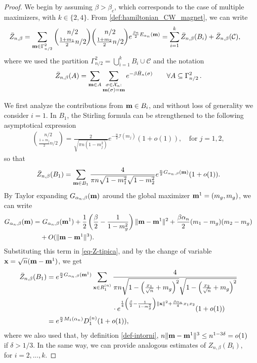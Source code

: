 \documentclass[10pt,a4paper]{amsart}
\def \bm {{\bf m}}
\def \s {{\sigma}}
\begin{document}
\begin{proof}
We begin by assuming $\beta>\beta_c$, which corresponds to the case of multiple maximizers, with $k\in\{2,4\}$. 
From  \eqref{def:hamiltonian_CW_magnet}, we can write
\begin{align*}
    \bar{Z}_{n,\beta} &=\sum_{\bm \in \Gamma_{n/2}^2} \binom{n/2}{\frac{1+m_1}{2}n/2} \binom{n/2}{\frac{1+m_2}{2}n/2} e^{\frac{\beta n}{2} E_{\alpha_n}(\bm)} = \sum_{i=1}^k \bar{Z}_{n,\beta}(B_i) +  \bar{Z}_{n,\beta}(\mathcal{C}),
\end{align*}
where we used the partition $\Gamma_{n/2}^2=\bigcup_{i=1}^k B_i \cup \mathcal{C}$ and the notation
$$\bar{Z}_{n,\beta}(A)= \sum_{\bm \in A} \sum_{\substack{\s\in\mathcal{X}_n:\\\bm(\s)=\bm}}e^{-\beta \bar{H}_n(\s)}\qquad \forall A\subseteq \Gamma_{n/2}^2\,.$$

We first analyze the contributions from $\bm\in B_i$, and without loss of generality we consider $i=1$. 
In $B_1$, the Stirling formula can be strengthened to the following asymptotical expression
\begin{align}\label{eq-coeffbin}
    \binom{n/2}{\frac{1+m_j}{2} n/2}= \frac{2}{\sqrt{\pi n (1-m_j^2)}}e^{- \frac{n}{2}\mathcal{I}(m_j)}(1+o(1)),
    \quad\mbox{for } j=1,2,
\end{align}
so that
\begin{align}\label{eq-Z-tipica}
    \bar{Z}_{n,\beta}(B_1)=\sum_{\bm \in B_1} \frac{4}{\pi n \sqrt{1-m_1^2} \sqrt{1-m_2^2}}e^{\frac{n}{2}G_{\alpha_n,\beta}(\bm)} (1+o(1)).
\end{align}
By Taylor expanding $G_{\alpha_n,\beta}(\bm)$ around the global maximizer $\bm^1=(m_g,m_g)$, we can write
\begin{align}\label{taylor_G}
    G_{\alpha_n,\beta}(\bm)= & \,\,G_{\alpha_n,\beta}(\bm^1)+\frac{1}{2} \left ( \frac{\beta}{2}-\frac{1}{1-m_g^2} \right )  \| \bm-\bm^1 \|^2+\frac{\beta \alpha_n}{2}(m_1-m_g)(m_2-m_g) \notag \\
    &+ O(\|\bm-\bm^1\|^3).
\end{align}
%
Substituting this term in \eqref{eq-Z-tipica}, and by the change of variable ${\bf{x}}=\sqrt{n}({\bf{m}}-{\bf{m}}^{1})$, we get
\begin{equation}\label{eq-Z-tipica2}
\begin{split}
    \bar{Z}_{n,\beta}(B_1)
    &=e^{\frac{n}{2}G_{\alpha_n,\beta}(\bm^1)}\sum_{{\bf x} \in R_1^{(n)}} \frac{4}{\pi n \sqrt{1- \left (\frac{x_1}{\sqrt{n}}+m_g \right )^2} \sqrt{1- \left (\frac{x_2}{\sqrt{n}}+m_g \right )^2}}  \\
    & \qquad\qquad\qquad\qquad\quad\,\,\, \cdot e^{ \frac{1}{4} \left ( \frac{\beta}{2}-\frac{1}{1-m_g^2} \right ) \|{\bf x}\|^2  +\frac{\beta \alpha_n}{4} x_1x_2}(1+o(1))  \\
    &= e^{\frac{n}{2}M_1(\alpha_n)} D_1^{(n)} (1+o(1)), 
\end{split}
\end{equation}
where we also used that, by definition \eqref{def-intorni}, $n\|\bm-\bm^1\|^3\le n^{1-3\delta}=o(1)$ if $\delta>1/3$. 
In the same way, we can provide analogous estimates of $Z_{n,\beta}(B_i)$, for $i=2,...,k$. 


\end{proof}
\end{document}
